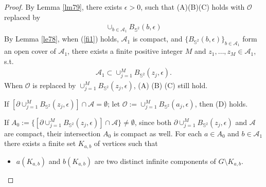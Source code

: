 \documentclass[11pt]{amsart}
\theoremstyle{plain}
\numberwithin{equation}{section}
\numberwithin{figure}{section}
\begin{document}
\begin{proof}By Lemma \ref{lm79}, there exists $\epsilon>0$, such that (A)(B)(C) holds with $\mathcal{O}$ replaced by 
\begin{align*}
\cup_{b\in\mathcal{A}_1} B_{\mathbb{S}^2}\left(b,\epsilon\right)
\end{align*}
By Lemma \ref{le78}, when (\ref{fi1}) holds, $\mathcal{A}_1$ is compact, and $\{B_{\mathbb{S}^2}\left(b,\epsilon\right)\}_{b\in \mathcal{A}_1}$ form an open cover of $\mathcal{A}_1$, there exists a finite positive integer $M$ and $z_1,\ldots,z_M\in \mathcal{A}_1$, s.t.
\begin{align*}
\mathcal{A}_1\subset \cup_{j=1}^M B_{\mathbb{S}^2}(z_j,\epsilon).
\end{align*}
When $\mathcal{O}$ is replaced by $\cup_{j=1}^M B_{\mathbb{S}^2}(z_j,\epsilon)$, (A) (B) (C) still hold.

If  $[\partial\cup_{j=1}^M B_{\mathbb{S}^2}(z_j,\epsilon)]\cap \mathcal{A}=\emptyset$; let $\mathcal{O}:=\cup_{j=1}^M B_{\mathbb{S}^2}(a_j,\epsilon)$, then (D) holds.

If  $A_0:=\{[\partial\cup_{j=1}^M B_{\mathbb{S}^2}(z_j,\epsilon)]\cap \mathcal{A}\}\neq \emptyset$, since both $\partial\cup_{j=1}^M B_{\mathbb{S}^2}(z_j,\epsilon)$ and $\mathcal{A}$ are compact, their intersection $A_0$ is compact as well. For each $a\in A_0$ and $b\in\mathcal{A}_1$ there exists a finite set  $K_{a,b}$ of vertices such that 
\begin{itemize}
\item $a(K_{a,b})$ and $b(K_{a,b})$ are two distinct infinite components of $G\setminus K_{a,b}$. 
\end{itemize}


\end{proof}
\end{document}
